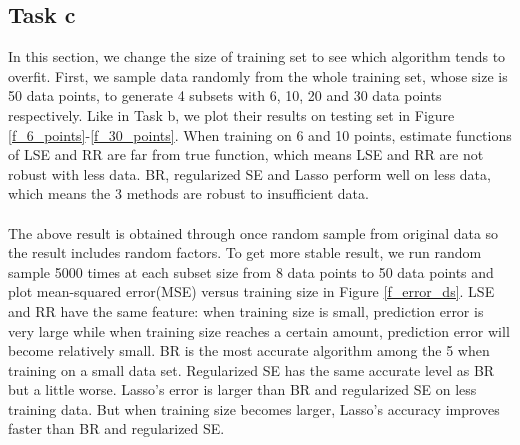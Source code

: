 \documentclass[a4paper]{article}
\begin{document}
\subsection{Task c}
In this section, we change the size of training set to see which algorithm tends to overfit. First, we sample data randomly from the whole training set, whose size is 50 data points, to generate 4 subsets with 6, 10, 20 and 30 data points respectively. Like in Task b, we plot their results on testing set in Figure \ref{f_6_points}-\ref{f_30_points}. When training on 6 and 10 points, estimate functions of LSE and RR are far from true function, which means LSE and RR are not robust with less data. BR, regularized SE and Lasso perform well on less data, which means the 3 methods are robust to insufficient data.\\
\\
The above result is obtained through once random sample from original data so the result includes random factors. To get more stable result, we run random sample 5000 times at each subset size from 8 data points to 50 data points and plot mean-squared error(MSE) versus training size in Figure \ref{f_error_ds}. LSE and RR have the same feature: when training size is small, prediction error is very large while when training size reaches a certain amount, prediction error will become relatively small. BR is the most accurate algorithm among the 5 when training on a small data set. Regularized SE has the same accurate level as BR but a little worse. Lasso's error is larger than BR and regularized SE on less training data. But when training size becomes larger, Lasso's accuracy improves faster than BR and regularized SE.
\end{document}
